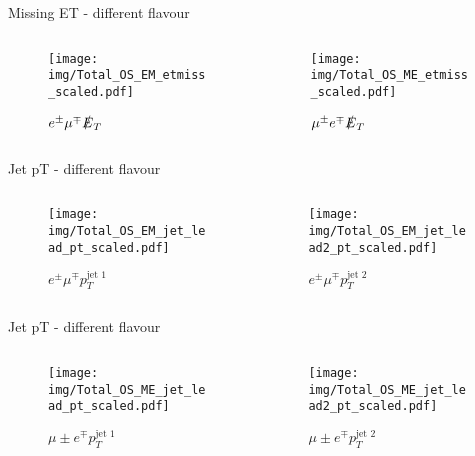 \documentclass{beamer}
\begin{document}
\begin{frame}{Missing ET - different flavour}
  \begin{columns}
    \begin{column}{0.45\textwidth}\begin{figure}
      \caption{$e^{\pm}\mu^{\mp}\slashed{E}_{T}$}
      \texttt{[image: img/Total\_OS\_EM\_etmiss\_scaled.pdf]}
    \end{figure}\end{column}
    \begin{column}{0.45\textwidth}\begin{figure}
      \caption{$\mu^{\pm}e^{\mp}\slashed{E}_{T}$}
      \texttt{[image: img/Total\_OS\_ME\_etmiss\_scaled.pdf]}
    \end{figure}\end{column}
  \end{columns}
\end{frame}

\begin{frame}{Jet pT - different flavour}
  \begin{columns}
    \begin{column}{0.45\textwidth}\begin{figure}
      \caption{$e^{\pm}\mu^{\mp}p_{T}^{\text{jet 1}}$}
      \texttt{[image: img/Total\_OS\_EM\_jet\_lead\_pt\_scaled.pdf]}
    \end{figure}\end{column}
    \begin{column}{0.45\textwidth}\begin{figure}
      \caption{$e^{\pm}\mu^{\mp}p_{T}^{\text{jet 2}}$}
      \texttt{[image: img/Total\_OS\_EM\_jet\_lead2\_pt\_scaled.pdf]}
    \end{figure}\end{column}
  \end{columns}
\end{frame}

\begin{frame}{Jet pT - different flavour}
  \begin{columns}
    \begin{column}{0.45\textwidth}\begin{figure}
      \caption{$\mu{\pm}e^{\mp}p_{T}^{\text{jet 1}}$}
      \texttt{[image: img/Total\_OS\_ME\_jet\_lead\_pt\_scaled.pdf]}
    \end{figure}\end{column}
    \begin{column}{0.45\textwidth}\begin{figure}
      \caption{$\mu{\pm}e^{\mp}p_{T}^{\text{jet 2}}$}
      \texttt{[image: img/Total\_OS\_ME\_jet\_lead2\_pt\_scaled.pdf]}
    \end{figure}\end{column}
  \end{columns}
\end{frame}
\end{document}
